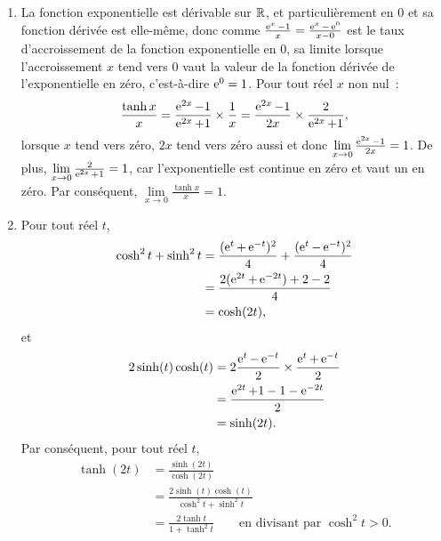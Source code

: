 \begin{corrige}
    \begin{enumerate}
        \item La fonction exponentielle est dérivable sur \(\mathbb{R}\), et particulièrement en \(0\) et sa fonction dérivée est elle-même, donc comme \(\frac{\operatorname{e}^x-1}{x} = \frac{\operatorname{e}^x-\operatorname{e}^0}{x-0}\) est le taux d'accroissement de la fonction exponentielle en \(0\), sa limite lorsque l'accroissement \(x\) tend vers \(0\) vaut la valeur de la fonction dérivée de l'exponentielle en zéro, c'est-à-dire \(\operatorname{e}^0 = 1\).
            Pour tout réel \(x\) non nul~:
            \begin{equation*}
                \frac{\tanh x}{x} = \frac{\operatorname{e}^{2x}-1}{\operatorname{e}^{2x}+1} \times \frac{1}{x} = \frac{\operatorname{e}^{2x}-1}{2x} \times \frac{2}{\operatorname{e}^{2x}+1},
            \end{equation*}
            lorsque \(x\) tend vers zéro, \(2x\) tend vers zéro aussi et donc \(\lim\limits_{x \to 0}\frac{\operatorname{e}^{2x}-1}{2x} = 1\). De plus, \(\lim\limits_{x \to 0} \frac{2}{\operatorname{e}^{2x}+1} = 1\), car l'exponentielle est continue en zéro et vaut un en zéro. Par conséquent, \(\lim\limits_{x \to 0} \frac{\tanh x}{x} = 1\).
        \item Pour tout réel \(t\),
            \begin{align*}
                \cosh^2 t + \sinh^2 t   &= \frac{(\operatorname{e}^t+\operatorname{e}^{-t})^2}{4} + \frac{(\operatorname{e}^t-\operatorname{e}^{-t})^2}{4} \\
                                        &= \frac{2(\operatorname{e}^{2t}+\operatorname{e}^{-2t}) +2 -2}{4} \\
                                        &= \cosh(2t),
            \end{align*}
            et
            \begin{align*}
                2\sinh(t)\cosh(t)   &= 2 \frac{\operatorname{e}^t - \operatorname{e}^{-t}}{2} \times \frac{\operatorname{e}^t + \operatorname{e}^{-t}}{2} \\
                                    &= \frac{\operatorname{e}^{2t}+1-1-\operatorname{e}^{-2t}}{2} \\
                                    &= \sinh(2t).
            \end{align*}
            Par conséquent, pour tout réel \(t\),
            \begin{align*}
                \tanh(2t)   &= \frac{\sinh(2t)}{\cosh(2t)} \\
                            &= \frac{2\sinh(t)\cosh(t)}{\cosh^2 t + \sinh^2 t} \\
                            &= \frac{2\tanh t}{1+\tanh^2 t} \qquad \text{en divisant par~} \cosh^2 t>0.

\end{align*}
\end{enumerate}
\end{corrige}
